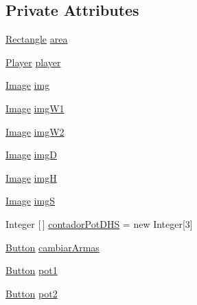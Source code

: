\subsection*{Private Attributes}
\begin{DoxyCompactItemize}
\item 
\mbox{\hyperlink{classorg_1_1newdawn_1_1slick_1_1geom_1_1_rectangle}{Rectangle}} \mbox{\hyperlink{classgui_1_1_inventary_g_u_i_a4668f71d7b4f5218cbd26bd81672f4a2}{area}}
\item 
\mbox{\hyperlink{classentities_1_1_player}{Player}} \mbox{\hyperlink{classgui_1_1_inventary_g_u_i_ac788453bd94ba3fa6875e67fed92e1d7}{player}}
\item 
\mbox{\hyperlink{classorg_1_1newdawn_1_1slick_1_1_image}{Image}} \mbox{\hyperlink{classgui_1_1_inventary_g_u_i_ad7400426ee730f4dda1db7df5fba8196}{img}}
\item 
\mbox{\hyperlink{classorg_1_1newdawn_1_1slick_1_1_image}{Image}} \mbox{\hyperlink{classgui_1_1_inventary_g_u_i_a4d623cf53fbc8fbb7bdd65ab3633f4f8}{img\+W1}}
\item 
\mbox{\hyperlink{classorg_1_1newdawn_1_1slick_1_1_image}{Image}} \mbox{\hyperlink{classgui_1_1_inventary_g_u_i_ae9efdba87b5117e72cd1be1c8722775c}{img\+W2}}
\item 
\mbox{\hyperlink{classorg_1_1newdawn_1_1slick_1_1_image}{Image}} \mbox{\hyperlink{classgui_1_1_inventary_g_u_i_a7255ffe29bae9cad8cc8ac6df535c78c}{imgD}}
\item 
\mbox{\hyperlink{classorg_1_1newdawn_1_1slick_1_1_image}{Image}} \mbox{\hyperlink{classgui_1_1_inventary_g_u_i_a587c9d52a48ce8780d2191f9f3a6c4b1}{imgH}}
\item 
\mbox{\hyperlink{classorg_1_1newdawn_1_1slick_1_1_image}{Image}} \mbox{\hyperlink{classgui_1_1_inventary_g_u_i_aba1d3852a9be0d6e7911efec0d4c7a03}{imgS}}
\item 
Integer \mbox{[}$\,$\mbox{]} \mbox{\hyperlink{classgui_1_1_inventary_g_u_i_a43c440436b74e888b47499677db277c6}{contador\+Pot\+D\+HS}} = new Integer\mbox{[}3\mbox{]}
\item 
\mbox{\hyperlink{classgui_1_1_button}{Button}} \mbox{\hyperlink{classgui_1_1_inventary_g_u_i_aea875536f310e3a9e31d6e31e7d74dfd}{cambiar\+Armas}}
\item 
\mbox{\hyperlink{classgui_1_1_button}{Button}} \mbox{\hyperlink{classgui_1_1_inventary_g_u_i_a1b69d690328c4a3fd951e8fa014500a3}{pot1}}
\item 
\mbox{\hyperlink{classgui_1_1_button}{Button}} \mbox{\hyperlink{classgui_1_1_inventary_g_u_i_aa291afde1f220f900c876b8ebe7c254b}{pot2}}

\end{DoxyCompactItemize}
